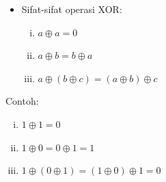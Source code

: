 \documentclass{article}
\begin{document}

\begin{itemize}
    \item Sifat-sifat operasi XOR:
    \begin{enumerate}[(i)]
        \item $a \oplus a = 0$
        \item $a \oplus b = b \oplus a$
        \item $a \oplus (b \oplus c) = (a \oplus b) \oplus c$
    \end{enumerate}
\end{itemize}

Contoh:
\begin{enumerate}[(i)]
    \item $1 \oplus 1 = 0$
    \item $1 \oplus 0 = 0 \oplus 1 = 1$
    \item $1 \oplus (0 \oplus 1) = (1 \oplus 0) \oplus 1 = 0$
\end{enumerate}
\end{document}
